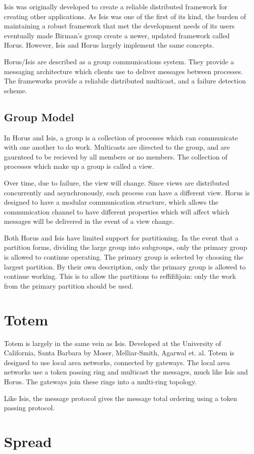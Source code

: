 Isis was originally developed to create a reliable distributed framework for
creating other applications. As Isis was one of the first of its kind, the
burden of maintaining a robust framework that met the development needs of its
users eventually made Birman's group create a newer, updated framework called
Horus. However, Isis and Horus largely implement the same concepts.

Horus/Isis are described as a group communications system. They provide a 
messaging architecture which clients use to deliver messages between processes.
The frameworks provide a reliabile distributed multicast, and a failure
detection scheme.

\subsection{Group Model}
In Horus and Isis, a group is a collection of processes which can communicate with one
another to do work. Multicasts are directed to the group, and are gaurnteed to
be recieved by all members or no members. The collection of processes which
make up a group is called a view.

Over time, due to failure, the view will change. Since views are distributed
concurrently and asynchronously, each process can have a different view. Horus
is designed to have a modular communication structure, which allows the 
communication channel to have different properties which will affect which 
messages will be delivered in the event of a view change.

Both Horus and Isis have limited support for partitioning. In the event that
a partition forms, dividing the large group into subgroups, only the primary
group is allowed to continue operating. The primary group is selected by
choosing the largest partition. By their own description, only the primary
group is allowed to continue working. This is to allow the partitions to
reffififijoin: only the work from the primary partition should be used.

\section{Totem}

Totem is largely in the same vein as Isis. Developed at the University of
California, Santa Barbara by Moser, Melliar-Smith, Agarwal et. al. Totem is
designed to use local area networks, connected by gateways. The local area
networks use a token passing ring and multicast the messages, much like Isis
and Horus. The gateways join these rings into a multi-ring topology.

Like Isis, the message protocol gives the message total ordering using a
token passing protocol.

\section{Spread}

